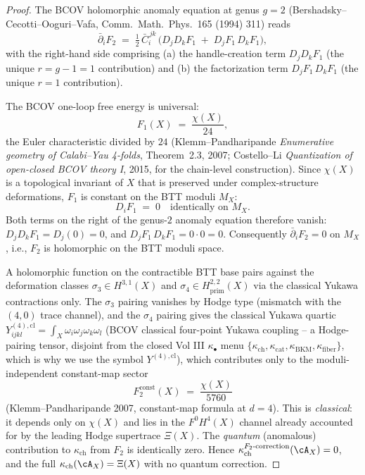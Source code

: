 \begin{proof}
The BCOV holomorphic anomaly equation at genus $g = 2$
(Bershadsky--Cecotti--Ooguri--Vafa, Comm.~Math.~Phys.~165 (1994) 311)
reads
\[
 \bar\partial_i F_2 \;=\; \tfrac{1}{2}\, \bar{C}_i^{\,jk}\,
 \bigl(D_j D_k F_1 \;+\; D_j F_1\, D_k F_1\bigr),
\]
with the right-hand side comprising (a) the handle-creation term
$D_j D_k F_1$ (the unique $r = g - 1 = 1$ contribution) and (b) the
factorization term $D_j F_1\, D_k F_1$ (the unique $r = 1$
contribution).

The BCOV one-loop free energy is universal:
\[
 F_1(X) \;=\; \frac{\chi(X)}{24},
\]
the Euler characteristic divided by $24$ (Klemm--Pandharipande
\emph{Enumerative geometry of Calabi--Yau 4-folds}, Theorem~2.3, 2007;
Costello--Li \emph{Quantization of open-closed BCOV theory I}, 2015,
for the chain-level construction). Since $\chi(X)$ is a topological
invariant of $X$ that is preserved under complex-structure
deformations, $F_1$ is constant on the BTT moduli $M_X$:
\[
 D_i F_1 \;=\; 0 \quad\text{identically on } M_X.
\]
Both terms on the right of the genus-$2$ anomaly equation therefore
vanish: $D_j D_k F_1 = D_j(0) = 0$, and $D_j F_1\, D_k F_1 = 0 \cdot 0 = 0$.
Consequently $\bar\partial_i F_2 = 0$ on $M_X$, i.e., $F_2$ is
holomorphic on the BTT moduli space.

A holomorphic function on the contractible BTT base pairs against the
deformation classes $\sigma_3 \in H^{3,1}(X)$ and
$\sigma_4 \in H^{2,2}_{\mathrm{prim}}(X)$ via the classical Yukawa
contractions only. The $\sigma_3$ pairing vanishes by Hodge type
(mismatch with the $(4,0)$ trace channel), and the $\sigma_4$ pairing
gives the classical Yukawa quartic
$Y^{(4),\mathrm{cl}}_{ijkl} = \int_X \omega_i \omega_j \omega_k \omega_l$
(BCOV classical four-point Yukawa coupling -- a Hodge-pairing tensor,
disjoint from the closed Vol III $\kappa_\bullet$ menu
$\{\kappa_{\mathrm{ch}}, \kappa_{\mathrm{cat}}, \kappa_{\mathrm{BKM}},
\kappa_{\mathrm{fiber}}\}$, which is why we use the symbol $Y^{(4),
\mathrm{cl}}$), which contributes only to the
moduli-independent constant-map sector
\[
 F_2^{\mathrm{const}}(X) \;=\; \frac{\chi(X)}{5760}
\]
(Klemm--Pandharipande 2007, constant-map formula at $d = 4$). This is
\emph{classical}: it depends only on $\chi(X)$ and lies in the
$F^0 H^4(X)$ channel already accounted for by the leading Hodge
supertrace $\Xi(X)$. The \emph{quantum} (anomalous) contribution to
$\kappa_{\mathrm{ch}}$ from $F_2$ is identically zero. Hence
$\kappa_{\mathrm{ch}}^{F_2\text{-correction}}(\cA_X) = 0$, and the
full $\kappa_{\mathrm{ch}}(\cA_X) = \Xi(X)$ with no quantum correction.
\end{proof}

